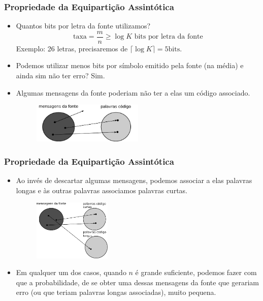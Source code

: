 \begin{frame}%
  \frametitle{Propriedade da Equipartição Assintótica}
  \begin{itemize}
  \item Quantos bits por letra da fonte utilizamos?
        \begin{equation}
        \text{taxa} = \frac{m}{n} \geq \log K \text{ bits por letra da fonte}
        \end{equation}
        Exemplo: 26 letras, precisaremos de $\lceil \log K \rceil = 5 \text{bits}$.
  \item Podemos utilizar menos bits por símbolo emitido pela fonte (na média) e ainda sim
        não ter erro? Sim.
  \item Algumas mensagens da fonte poderiam não ter a elas um código associado.

  \begin{figure}[h!]
  \centering
  \includegraphics[width=0.5\textwidth]{images/cword-map.pdf}
  \label{fig:cword-map}
  \end{figure}

  \end{itemize}
\end{frame}


\begin{frame}%
  \frametitle{Propriedade da Equipartição Assintótica}
  \begin{itemize}
  \item Ao invés de descartar algumas mensagens, podemos associar a elas palavras longas
        e às outras palavras associamos palavras curtas.

  \begin{figure}[h!]
  \centering   
  \includegraphics[width=0.35\textwidth]{images/cword-map2.pdf}
  \label{fig:cword-map}
  \end{figure}

  \item Em qualquer um dos casos, quando $n$ é grande suficiente, podemos fazer com que a
        probabilidade, de se obter uma dessas mensagens da fonte que gerariam erro 
        (ou que teriam palavras longas associadas), muito pequena.

  \end{itemize}
\end{frame}



